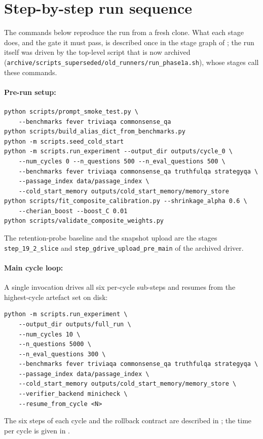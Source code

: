 \section{Step-by-step run sequence}
\label{app:repro-steps}

The commands below reproduce the run from a fresh clone. What each stage does, and the gate it must pass, is described once in the stage graph of ; the run itself was driven by the top-level script that is now archived (\verb|archive/scripts_superseded/old_runners/run_phase1a.sh|), whose stages call these commands.

\paragraph{Pre-run setup:}
\begin{verbatim}
python scripts/prompt_smoke_test.py \
    --benchmarks fever triviaqa commonsense_qa
python scripts/build_alias_dict_from_benchmarks.py
python -m scripts.seed_cold_start
python -m scripts.run_experiment --output_dir outputs/cycle_0 \
    --num_cycles 0 --n_questions 500 --n_eval_questions 500 \
    --benchmarks fever triviaqa commonsense_qa truthfulqa strategyqa \
    --passage_index data/passage_index \
    --cold_start_memory outputs/cold_start_memory/memory_store
python scripts/fit_composite_calibration.py --shrinkage_alpha 0.6 \
    --cherian_boost --boost_C 0.01
python scripts/validate_composite_weights.py
\end{verbatim}
The retention-probe baseline and the snapshot upload are the stages \verb|step_19_2_slice| and \verb|step_gdrive_upload_pre_main| of the archived driver.

\paragraph{Main cycle loop:} A single invocation drives all six per-cycle sub-steps and resumes from the highest-cycle artefact set on disk:
\begin{verbatim}
python -m scripts.run_experiment \
    --output_dir outputs/full_run \
    --num_cycles 10 \
    --n_questions 5000 \
    --n_eval_questions 300 \
    --benchmarks fever triviaqa commonsense_qa truthfulqa strategyqa \
    --passage_index data/passage_index \
    --cold_start_memory outputs/cold_start_memory/memory_store \
    --verifier_backend minicheck \
    --resume_from_cycle <N>
\end{verbatim}
The six steps of each cycle and the rollback contract are described in \Cref{app:runbook}; the time per cycle is given in \Cref{app:repro-hardware}.

